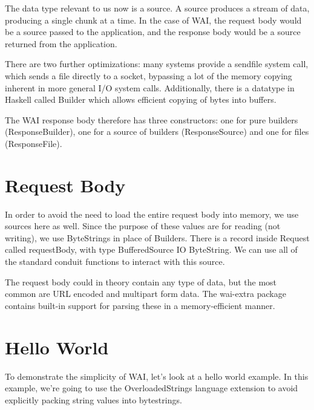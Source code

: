 
The data type relevant to us now is a source. A source produces a stream of
data, producing a single chunk at a time. In the case of WAI, the request body would be
a source passed to the application, and the response body would be a source returned
from the application.

There are two further optimizations: many systems provide a sendfile system call, which 
sends a file directly to a socket, bypassing a lot of the memory copying inherent in more
general I/O system calls. Additionally, there is a datatype in Haskell called Builder which 
allows efficient copying of bytes into buffers.

The WAI response body therefore has three constructors: one for pure builders
(ResponseBuilder), one for a source of builders (ResponseSource) and one for files (ResponseFile).

\section {Request Body}

In order to avoid the need to load the entire request body into memory, we use
sources here as well. Since the purpose of these values are for reading (not writing),
we use ByteStrings in place of Builders. There is a record inside Request called
requestBody, with type BufferedSource IO ByteString. We can use all of the standard 
conduit functions to interact with this source.

The request body could in theory contain any type of data, but the most common are 
URL encoded and multipart form data. The wai-extra package contains built-in support 
for parsing these in a memory-efficient manner.

\section{Hello World}

To demonstrate the simplicity of WAI, let's look at a hello world example. 
In this example, we're going to use the OverloadedStrings language extension to avoid 
explicitly packing string values into bytestrings.

